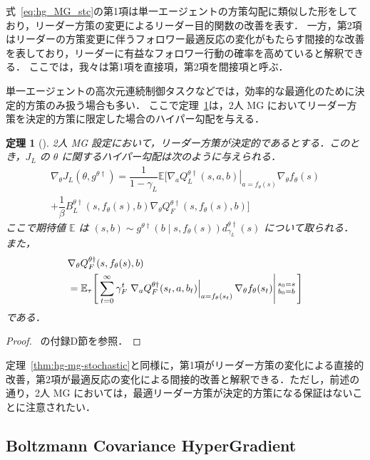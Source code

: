 \documentclass[originalpaper,fleqn]{jsaiart}     %
\providecommand{\E}{\mathbb{E}} %
\newtheorem{theorem}{定理}
\begin{document}
式~\eqref{eq:hg_MG_stc}の第1項は単一エージェントの方策勾配に類似した形をしており，リーダー方策の変更によるリーダー目的関数の改善を表す．
一方，第2項はリーダーの方策変更に伴うフォロワー最適反応の変化がもたらす間接的な改善を表しており，リーダーに有益なフォロワー行動の確率を高めていると解釈できる．
ここでは，我々は第1項を直接項，第2項を間接項と呼ぶ．

単一エージェントの高次元連続制御タスクなどでは，効率的な最適化のために決定的方策のみ扱う場合も多い．
ここで定理~\ref{thm:hg-mg-deterministic}は，2人 MG においてリーダー方策を決定的方策に限定した場合のハイパー勾配を与える．

\begin{theorem}[]\label{thm:hg-mg-deterministic}
2人 MG 設定において，リーダー方策が決定的であるとする．このとき，$J_L$ の $\theta$ に関するハイパー勾配は次のように与えられる．
\begin{multline}
    \nabla_{\theta}J_L({\theta}, g^{\theta\dagger})
    =\dfrac{1}{1-\gamma_L}\E\bigg[\left.\nabla_a Q_L^{{\theta}\dagger}(s,a,b)\right|_{a=f_{\theta}(s)}\nabla_{\theta}f_{\theta}(s)
   \\+\dfrac{1}{\beta} B_L^{{\theta}\dagger}(s,f_{\theta}(s),b) \nabla_{\theta}Q_F^{\theta\dagger}(s,f_{\theta}(s),b)\bigg]\label{eq:hg_MG_det}
\end{multline}
ここで期待値 $\E$ は $(s,b) \sim g^{{\theta}\dagger}(b\mid s,f_{\theta}(s)) d_{\gamma_L}^{\theta\dagger}(s)$ について取られる．
また，
\begin{align}
    &\nabla_{\theta}Q_F^{\theta\dagger}(s,f_{\theta}(s),b) \label{eq:nablaQF_MG_det}\\ &=\E_{\tau}\Bigg[\sum_{t=0}^\infty \gamma_F^t \left.\nabla_a Q_F^{\theta\dag}(s_t,a,b_t)\right|_{a=f_{\theta}(s_t)}\nabla_{\theta}f_{\theta}(s_t)\Bigg|\begin{smallmatrix}s_0=s\\b_0=b\end{smallmatrix}\Bigg]\notag
\end{align}
である．
\end{theorem}
\begin{proof}
    ~\cite{kudo2026-arxiv}の付録D節を参照．
\end{proof}

定理~\ref{thm:hg-mg-stochastic}と同様に，第1項がリーダー方策の変化による直接的改善，第2項が最適反応の変化による間接的改善と解釈できる．ただし，前述の通り，2人 MG においては，最適リーダー方策が決定的方策になる保証はないことに注意されたい．

\subsection{Boltzmann Covariance HyperGradient}
\end{document}
